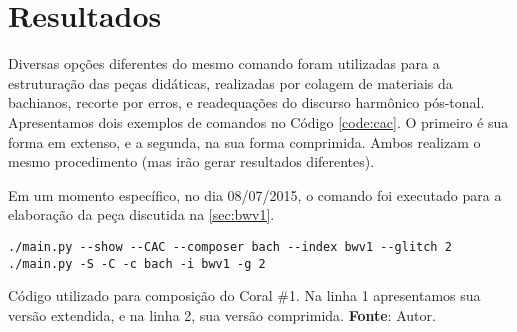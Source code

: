 \section{Resultados}\label{sec:resultados}

Diversas opções diferentes do mesmo comando foram utilizadas para a estruturação das peças didáticas, realizadas por colagem de materiais da bachianos, recorte por erros, e readequações do discurso harmônico pós-tonal. Apresentamos dois exemplos de comandos no Código \ref{code:cac}. O primeiro é sua forma em extenso, e a segunda, na sua forma comprimida. Ambos realizam o mesmo procedimento (mas irão gerar resultados diferentes).

Em um momento específico, no dia 08/07/2015, o comando foi executado para a elaboração da peça discutida na \ref{sec:bwv1}.

\begin{listing}
\begin{verbatim}
./main.py --show --CAC --composer bach --index bwv1 --glitch 2
./main.py -S -C -c bach -i bwv1 -g 2
\end{verbatim}
\caption{Código utilizado para composição do Coral \#1. Na linha 1 apresentamos sua versão extendida, e na linha 2, sua versão comprimida. \textbf{Fonte}: Autor.}
\label{code:cac}
\end{listing}

